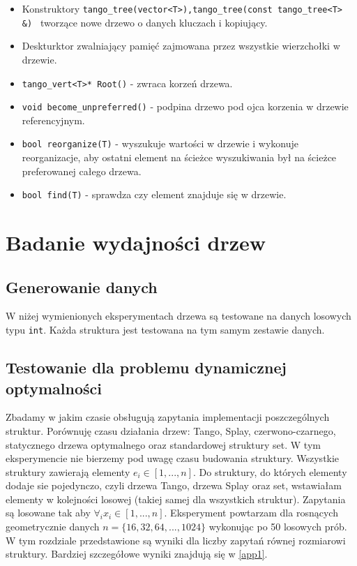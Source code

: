 \documentclass[declaration,shortabstract]{iithesis}
\theoremstyle{thm}
\theoremstyle{remark}
\theoremstyle{plain}
\theoremstyle{plain}
\theoremstyle{plain}
\begin{document}
\begin{itemize}

\item{Konstruktory \texttt{tango\_tree(vector<T>),tango\_tree(const tango\_tree<T> \&) } tworzące nowe drzewo o danych kluczach i kopiujący.}

\item{Deskturktor zwalniający pamięć zajmowana przez wszystkie wierzchołki w drzewie.}

\item{\texttt{tango\_vert<T>* Root()} - zwraca korzeń drzewa.}

\item{\texttt{void become\_unpreferred()} - podpina drzewo pod ojca korzenia w drzewie referencyjnym.}

\item{\texttt{bool reorganize(T)} - wyszukuje wartości w drzewie i wykonuje reorganizacje, aby ostatni element na ścieżce wyszukiwania był na ścieżce preferowanej całego drzewa.}

\item{\texttt{bool find(T)} - sprawdza czy element znajduje się w drzewie.}
       

\end{itemize}


\chapter{Badanie wydajności drzew}
\section{Generowanie danych}
W niżej wymienionych eksperymentach drzewa są testowane na danych losowych typu \texttt{int}. Każda struktura jest testowana na tym samym zestawie danych.


\section{Testowanie dla problemu dynamicznej optymalności}
Zbadamy w jakim czasie obsługują zapytania implementacji poszczególnych struktur. Porównuję czasu działania drzew: Tango, Splay, czerwono-czarnego, statycznego drzewa optymalnego oraz standardowej struktury set. W tym eksperymencie nie bierzemy pod uwagę czasu budowania struktury. Wszystkie struktury zawierają elementy \(e_i \in [1, ..., n]\). Do struktury, do których elementy dodaje sie pojedynczo, czyli drzewa Tango, drzewa Splay oraz set, wstawiałam elementy w kolejności losowej (takiej samej dla wszystkich struktur). Zapytania są losowane tak aby \(\forall_i x_i \in [1, ..., n]\). Eksperyment powtarzam dla rosnących geometrycznie danych \( n = \{16, 32, 64, ..., 1024\}\) wykonując po 50 losowych prób. W tym rozdziale przedstawione są wyniki dla liczby zapytań równej rozmiarowi struktury. Bardziej szczegółowe wyniki znajdują się w \ref{app1}.
 
\end{document}
